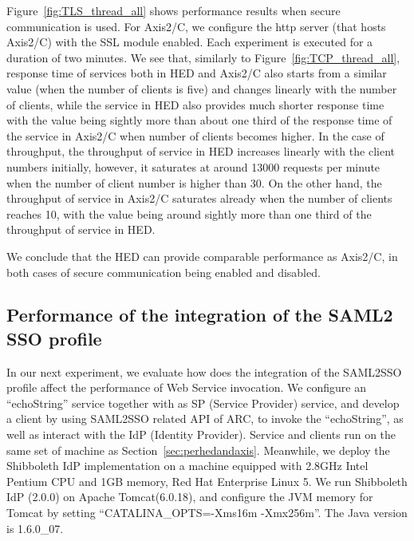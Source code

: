 \documentclass[conference]{IEEEtran}
\begin{document}
Figure~\ref{fig:TLS_thread_all} shows performance results when secure
communication is used. For Axis2/C, we configure the http server (that hosts Axis2/C) with the SSL
module enabled. Each experiment is executed for a duration of two minutes.
We see that, similarly to Figure~\ref{fig:TCP_thread_all}, response
time of services both in HED and Axis2/C also starts from a similar value (when the number of
clients is five) and changes linearly with the number of clients, while the service in HED also provides much shorter
response time with the value being sightly more than about one third of the response time of
the service in Axis2/C when  number of clients becomes higher.
In the case of throughput, the throughput of service in HED increases linearly
with the client numbers initially, however, it saturates at around 13000 requests per
minute when the number  of client number is higher than 30. On the other hand, the throughput of service in
Axis2/C saturates already when the number of clients reaches 10, with
the value being around sightly more than one third of the throughput of service in HED.

We conclude that the HED can provide comparable performance 
as Axis2/C, in both cases of secure communication being enabled and disabled.

\subsection{Performance of the integration of the SAML2 SSO profile}
\label{sec:perfsaml2sso}
In our next experiment, we evaluate how does the integration of the SAML2SSO
profile affect the performance of Web Service invocation. We configure an ``echoString'' service
together with as SP (Service Provider) service, and develop a client by using
SAML2SSO related API of ARC, to invoke the ``echoString'', as well as interact with the IdP (Identity Provider).
Service and clients run on the same set of machine as Section~\ref{sec:perhedandaxis}. Meanwhile, we deploy
the Shibboleth IdP implementation on a machine equipped with 2.8GHz Intel Pentium CPU and 1GB
memory, Red Hat Enterprise Linux 5. We run Shibboleth IdP (2.0.0) on Apache Tomcat(6.0.18), and
configure the JVM memory for Tomcat by setting ``CATALINA\_OPTS=-Xms16m -Xmx256m''. The Java
version is 1.6.0\_07. 
\end{document}
